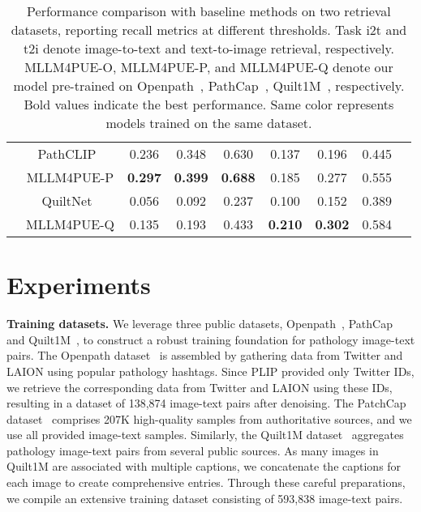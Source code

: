 \begin{table*}[h!]
\begin{tabular}{ccccccccc}
& \cellcolor{trainB} PathCLIP~\cite{ikezogwo2024quilt} & \cellcolor{trainB} 0.236 & \cellcolor{trainB} 0.348 & \cellcolor{trainB} 0.630 & \cellcolor{trainB} 0.137 & \cellcolor{trainB} 0.196 & \cellcolor{trainB} 0.445\\ 
& \cellcolor{trainB} MLLM4PUE-P & \cellcolor{trainB} \textbf{0.297} & \cellcolor{trainB} \textbf{0.399} & \cellcolor{trainB} \textbf{0.688} & \cellcolor{trainB} 0.185 & \cellcolor{trainB} 0.277 & \cellcolor{trainB} 0.555\\ 
& \cellcolor{trainC} QuiltNet~\cite{ikezogwo2024quilt} & \cellcolor{trainC} 0.056 & \cellcolor{trainC} 0.092 & \cellcolor{trainC} 0.237 & \cellcolor{trainC} 0.100 & \cellcolor{trainC} 0.152 & \cellcolor{trainC} 0.389\\ 
& \cellcolor{trainC} MLLM4PUE-Q & \cellcolor{trainC} 0.135 & \cellcolor{trainC} 0.193 & \cellcolor{trainC} 0.433 & \cellcolor{trainC} \textbf{0.210} & \cellcolor{trainC} \textbf{0.302} & \cellcolor{trainC} 0.584\\ 
\hline
\end{tabular}
\caption{Performance comparison with baseline methods on two retrieval datasets, reporting recall metrics at different thresholds. Task i2t and t2i denote image-to-text and text-to-image retrieval, respectively. MLLM4PUE-O, MLLM4PUE-P, and MLLM4PUE-Q denote our model pre-trained on Openpath~\cite{huang2023visual}, PathCap~\cite{sun2024pathasst},  Quilt1M~\cite{ikezogwo2024quilt}, respectively. Bold values indicate the best performance. Same color represents models trained on the same dataset.}
\label{t2}
\end{table*}
\section{Experiments}
\textbf{Training datasets.} 
We leverage three public datasets, Openpath~\cite{huang2023visual}, PathCap~\cite{sun2024pathasst} and Quilt1M~\cite{ikezogwo2024quilt}, to construct a robust training foundation for pathology image-text pairs. The Openpath dataset~\cite{huang2023visual} is assembled by gathering data from Twitter and LAION using popular pathology hashtags. Since PLIP\cite{huang2023visual} provided only Twitter IDs, we retrieve the corresponding data from Twitter and LAION using these IDs, resulting in a dataset of 138,874 image-text pairs after denoising. The PatchCap dataset~\cite{sun2024pathasst} comprises 207K high-quality samples from authoritative sources, and we use all provided image-text samples. Similarly, the Quilt1M dataset~\cite{ikezogwo2024quilt} aggregates pathology image-text pairs from several public sources. As many images in Quilt1M are associated with multiple captions, we concatenate the captions for each image to create comprehensive entries. Through these careful preparations, we compile an extensive training dataset consisting of 593,838 image-text pairs.

